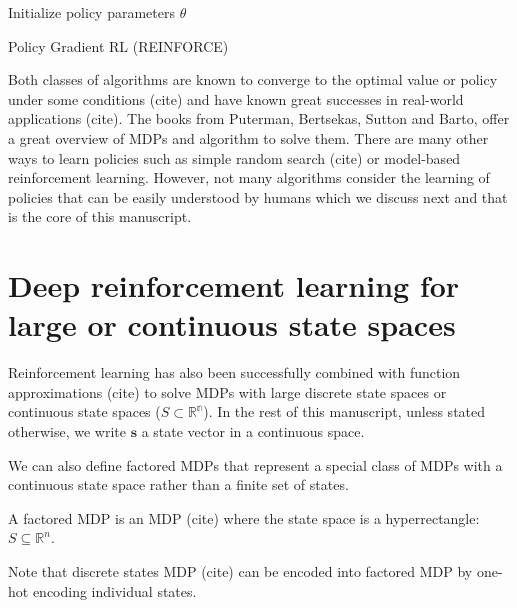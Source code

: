 \begin{algorithm}
    Initialize policy parameters $\theta$ \\
    \caption{Policy Gradient RL (REINFORCE)}\label{alg:reinforce}
\end{algorithm}


Both classes of algorithms are known to converge to the optimal value or policy under some conditions (cite) and have known great successes in real-world applications (cite).
The books from Puterman, Bertsekas, Sutton and Barto, offer a great overview of MDPs and algorithm to solve them.
There are many other ways to learn policies such as simple random search (cite) or model-based reinforcement learning. 
However, not many algorithms consider the learning of policies that can be easily understood by humans which we discuss next and that is the core of this manuscript.


\section{Deep reinforcement learning for large or continuous state spaces}

Reinforcement learning has also been successfully combined with function approximations (cite) to solve MDPs with large discrete state spaces or continuous state spaces ($S \subset \mathbb{R^n}$).
In the rest of this manuscript, unless stated otherwise, we write $\boldsymbol{s}$ a state vector in a continuous space.

We can also define factored MDPs that represent a special class of MDPs with a continuous state space rather than a finite set of states.

\begin{definition} A factored MDP is an MDP (cite) where the state space is a hyperrectangle: $S\subseteq \mathbb{R}^n$.
\end{definition}
Note that discrete states MDP (cite) can be encoded into factored MDP by one-hot encoding individual states.

